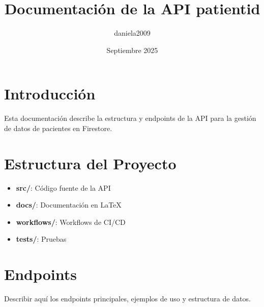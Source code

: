 \documentclass{article}
\title{Documentación de la API patientid}
\author{daniela2009}
\date{Septiembre 2025}
\begin{document}
\maketitle

\section{Introducción}
Esta documentación describe la estructura y endpoints de la API para la gestión de datos de pacientes en Firestore.

\section{Estructura del Proyecto}
\begin{itemize}
  \item \textbf{src/}: Código fuente de la API
  \item \textbf{docs/}: Documentación en LaTeX
  \item \textbf{workflows/}: Workflows de CI/CD
  \item \textbf{tests/}: Pruebas
\end{itemize}

\section{Endpoints}
Describir aquí los endpoints principales, ejemplos de uso y estructura de datos.
\end{document}
